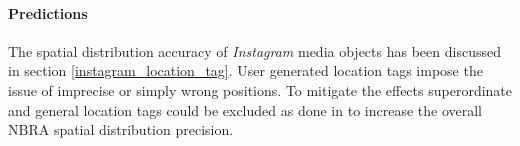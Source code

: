 \paragraph*{Predictions}
The spatial distribution accuracy of \textit{Instagram} media objects has been discussed in section \ref{instagram_location_tag}. User generated location tags impose the issue of imprecise or simply wrong positions. To mitigate the effects superordinate and general location tags could be excluded as done in \parencite{Heikinheimo2017} to increase the overall NBRA spatial distribution precision.